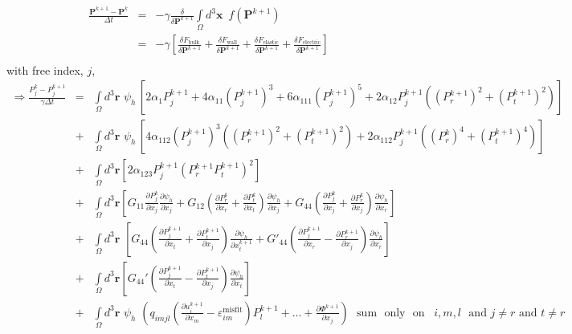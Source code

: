 \documentclass[16pt]{article} %
\begin{document}
\vspace{-10pt}
\begin{eqnarray}\nonumber
 \frac{\textbf{P}^{k+1} - \textbf{P}^k}{\Delta t} &=& -\gamma \frac{\delta}{\delta \textbf{P}^{k+1}}\int\limits_\Omega d^3 {\boldsymbol x} \,\,\,f\left(\textbf{P}^{k+1} \right)\\ \nonumber
&=& -\gamma \left[\frac{\delta F_\mathrm{bulk}}{\delta \textbf{P}^{k+1}}+ \frac{\delta F_\mathrm{wall}}{\delta \textbf{P}^{k+1}}+ \frac{\delta F_\mathrm{elastic}}{\delta \textbf{P}^{k+1}} + \frac{\delta F_\mathrm{electric}}{\delta \textbf{P}^{k+1}} \right]\\ \nonumber
\end{eqnarray}
%
with free index, $j$, 
%
\begin{eqnarray}\nonumber
\Rightarrow \frac{P_j^k - P_j^{k+1}}{\gamma \Delta t}  &=& \int\limits_\Omega d^3 \textbf{r} \,\, \psi_h\,\left[2 \alpha_1 P_j^{k+1} + 4 \alpha_{11} (P_j^{k+1})^3 + 6 \alpha_{111} (P_j^{k+1})^5 + 2 \alpha_{12} P_j^{k+1} \left((P_r^{k+1})^2 + (P_t^{k+1})^2 \right) \right]\\ \nonumber
&+& \int\limits_\Omega  d^3 \textbf{r}\,\,\psi_h\, \left[4 \alpha_{112} (P_j^{k+1})^3 \left(\left(P_r^{k+1}\right)^2 +( P_t^{k+1})^2 \right)  +  2 \alpha_{112} P_j^{k+1} \left((P_r^k)^4 + (P_t^{k+1})^4 \right) \right] \\ \nonumber
&+& \int\limits_\Omega d^3 \textbf{r} \left[2 \alpha_{123} P_j^{k+1} \left(P_r^{k+1} P_t^{k+1}\right)^2  \right] \\ \nonumber
&+& \int\limits_\Omega d^3 \textbf{r} \left[G_{11} \frac{\partial P^k_j}{\partial x_j} \frac{\partial \psi_h}{\partial x_j} + G_{12} \left(\frac{\partial P^k_r}{\partial x_r} + \frac{\partial P^k_t}{\partial x_t} \right) \frac{\partial \psi_h}{\partial x_j} + G_{44} \left(\frac{\partial P^k_j}{\partial x_j} + \frac{\partial P^k_r}{\partial x_j} \right)\frac{\partial \psi_h}{\partial x_r} \right]\\ \nonumber
&+& \int\limits_\Omega d^3 \textbf{r} \,\,\left[ G_{44} \left(\frac{\partial P^{k+1}_j}{\partial x_t} + \frac{\partial P^{k+1}_t}{\partial x_j} \right) \frac{\partial \psi_h}{\partial x^{k+1}_t} + G'_{44} \left(\frac{\partial P^{k+1}_j}{\partial x_r}  - \frac{\partial P^{k+1}_r}{\partial x_j}\right) \frac{\partial \psi_h}{\partial x_r} \right] \\ \nonumber
&+& \int\limits_\Omega d^3 \textbf{r}\left[G_{44}' \left(\frac{\partial P^{k+1}_j}{\partial x_t} - \frac{\partial P^{k+1}_t}{\partial x_j} \right) \frac{\partial \psi_h}{\partial x_t}\right]\\ \nonumber
&+&  \int\limits_\Omega d^3 \textbf{r}\,\, \psi_h \,\, \left(q_{imjl}\left( \frac{\partial u^{k+1}_i}{\partial x_m} - \varepsilon_{im}^\mathrm{misfit} \right) P^{k+1}_l  + ... + \frac{\partial \Phi^{k+1}}{\partial x_j}  \right)  \,\,\,\,\mathrm{sum}\,\,\,\,\mathrm{only}\,\,\,\,\mathrm{on}\,\,\,\,\, i,m,l \,\,\,\,\mathrm{and}\,\, j \neq r \,\,\mathrm{and}\,\, t \neq r\\ \nonumber %
\end{eqnarray}
\end{document}
